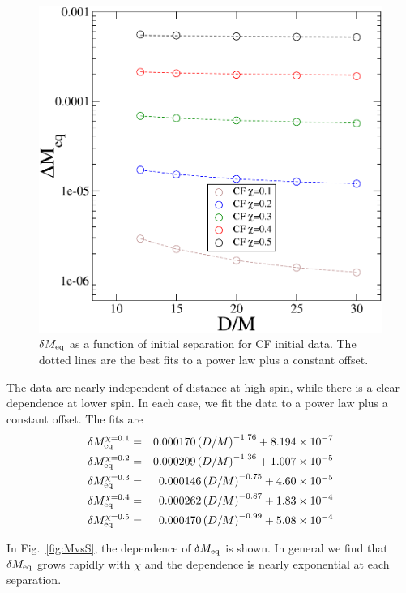 \begin{figure}[!htbp]
\includegraphics[scale=0.95]{chap5/MvsD2}
\caption{$\delta M_{\rm eq}$ as a function of initial separation for
  CF initial data. The dotted lines are the best fits to a power law
  plus a constant offset.}
\label{fig:MvsD}
\end{figure}

The data are nearly independent of distance at high spin, while there
is a clear dependence at lower spin. In each case, we fit the data to
a power law plus a constant offset. The fits are
\begin{eqnarray*}
\delta M_{\rm eq}^{\chi = 0.1} &=&
0.000170\left(D/M\right)^{-1.76}+8.194\times 10^{-7} \\
\delta M_{\rm eq}^{\chi = 0.2} &=&
0.000209\left(D/M\right)^{-1.36}+1.007\times 10^{-5} \\
\delta M_{\rm eq}^{\chi = 0.3} &=&
0.000146\left(D/M\right)^{-0.75}+4.60\times 10^{-5} \\
\delta M_{\rm eq}^{\chi = 0.4} &=&
0.000262\left(D/M\right)^{-0.87}+1.83\times 10^{-4} \\
\delta M_{\rm eq}^{\chi = 0.5} &=&
0.000470\left(D/M\right)^{-0.99}+5.08\times 10^{-4} 
\end{eqnarray*}

In Fig.~\ref{fig:MvsS}, the dependence of $\delta M_{\rm eq}$ is
shown. In general we find that $\delta M_{\rm eq}$ grows rapidly with
$\chi$ and the dependence is nearly exponential at each separation.

